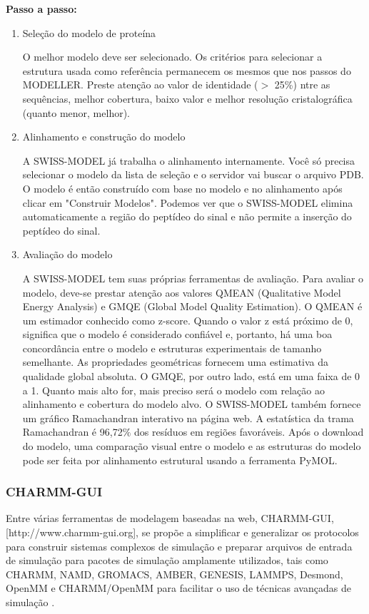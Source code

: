 \documentclass[11pt, letterpaper, portuguese]{article}
\begin{document}
        \par \textbf{Passo a passo:}
            \begin{enumerate}
                \item Seleção do modelo de proteína
                \par  O melhor modelo deve ser selecionado. Os critérios para selecionar a estrutura usada como referência permanecem os mesmos que nos passos do MODELLER. Preste atenção ao valor de identidade ($>$ 25\%) ntre as sequências, melhor cobertura, baixo valor e melhor resolução cristalográfica (quanto menor, melhor).
               \item Alinhamento e construção do modelo
               \par A SWISS-MODEL já trabalha o alinhamento internamente. Você só precisa selecionar o modelo da lista de seleção e o servidor vai buscar o arquivo PDB. O modelo é então construído com base no modelo e no alinhamento após clicar em "Construir Modelos". Podemos ver que o SWISS-MODEL elimina automaticamente a região do peptídeo do sinal e não permite a inserção do peptídeo do sinal.
                \item Avaliação do modelo
                \par A SWISS-MODEL tem suas próprias ferramentas de avaliação. Para avaliar o modelo, deve-se prestar atenção aos valores QMEAN (Qualitative Model Energy Analysis) e GMQE (Global Model Quality Estimation). O QMEAN é um estimador conhecido como z-score. Quando o valor z está próximo de 0, significa que o modelo é considerado confiável e, portanto, há uma boa concordância entre o modelo e estruturas experimentais de tamanho semelhante. As propriedades geométricas fornecem uma estimativa da qualidade global absoluta. O GMQE, por outro lado, está em uma faixa de 0 a 1. Quanto mais alto for, mais preciso será o modelo com relação ao alinhamento e cobertura do modelo alvo. O SWISS-MODEL também fornece um gráfico Ramachandran interativo na página web. A estatística da trama Ramachandran é 96,72$\%$ dos resíduos em regiões favoráveis. Após o download do modelo, uma comparação visual entre o modelo e as estruturas do modelo pode ser feita por alinhamento estrutural usando a ferramenta PyMOL.
            \end{enumerate}

\subsubsection{CHARMM-GUI}
        \par Entre várias ferramentas de modelagem baseadas na web, CHARMM-GUI,[http://www.charmm-gui.org], se propõe a simplificar e generalizar os protocolos para construir sistemas complexos de simulação e preparar arquivos de entrada de simulação para pacotes de simulação amplamente utilizados, tais como CHARMM, NAMD, GROMACS, AMBER, GENESIS, LAMMPS, Desmond, OpenMM e CHARMM/OpenMM para facilitar o uso de técnicas avançadas de simulação \cite{Jo_2017}.
     
\end{document}
